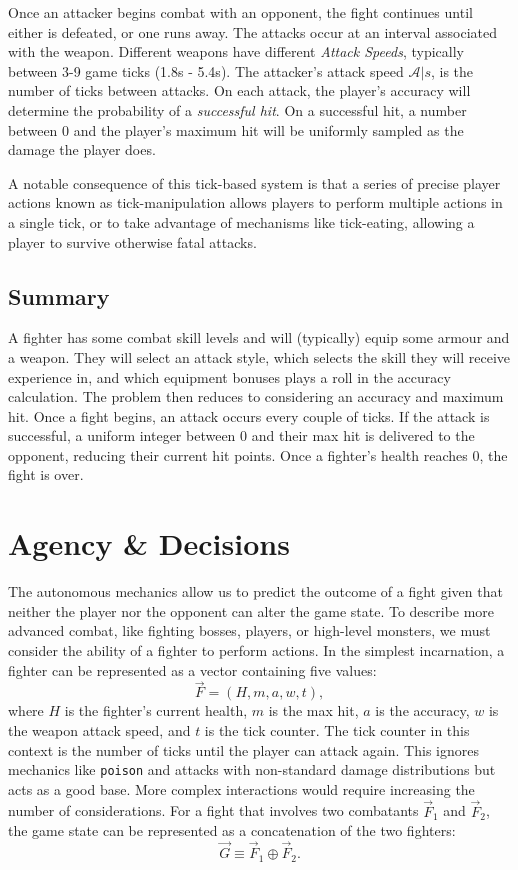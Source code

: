 		Once an attacker begins combat with an opponent, the fight continues until either is defeated, or one runs away. The attacks occur at an interval associated with the weapon. Different weapons have different \textit{Attack Speeds}, typically between 3-9 game ticks (1.8s - 5.4s). The attacker's attack speed $\mathcal{A}|s$, is the number of ticks between attacks. On each attack, the player's accuracy will determine the probability of a \textit{successful hit}. On a successful hit, a number between 0 and the player's maximum hit will be uniformly sampled as the damage the player does.

		A notable consequence of this tick-based system is that a series of precise player actions known as tick-manipulation allows players to perform multiple actions in a single tick, or to take advantage of mechanisms like tick-eating, allowing a player to survive otherwise fatal attacks.

	\subsection{Summary}
		A fighter has some combat skill levels and will (typically) equip some armour and a weapon. They will select an attack style, which selects the skill they will receive experience in, and which equipment bonuses plays a roll in the accuracy calculation. The problem then reduces to considering an accuracy and maximum hit. Once a fight begins, an attack occurs every couple of ticks. If the attack is successful, a uniform integer between 0 and their max hit is delivered to the opponent, reducing their current hit points. Once a fighter's health reaches 0, the fight is over.


\section{Agency \& Decisions}
	The autonomous mechanics allow us to predict the outcome of a fight given that neither the player nor the opponent can alter the game state. To describe more advanced combat, like fighting bosses, players, or high-level monsters, we must consider the ability of a fighter to perform actions. In the simplest incarnation, a fighter can be represented as a vector containing five values:
	\begin{equation}
		\vec{F}=(H, m, a, w, t),
	\end{equation}
	where $H$ is the fighter's current health, $m$ is the max hit, $a$ is the accuracy, $w$ is the weapon attack speed, and $t$ is the tick counter. The tick counter in this context is the number of ticks until the player can attack again. This ignores mechanics like \texttt{poison} and attacks with non-standard damage distributions but acts as a good base. More complex interactions would require increasing the number of considerations. For a fight that involves two combatants $\vec{F}_1$ and $\vec{F}_2$, the game state can be represented as a concatenation of the two fighters: 
	\begin{equation}
		\vec{G}\equiv \vec{F}_1\oplus \vec{F}_2.
	\end{equation}

